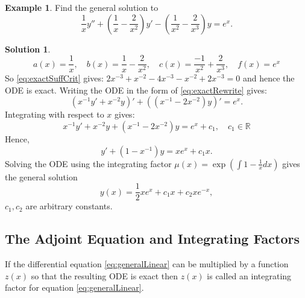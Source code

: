 \documentclass{article}
\theoremstyle{plain}
\theoremstyle{definition}
\newtheorem{exmp}{Example}[section]
\newtheorem*{sol}{Solution}
\numberwithin{equation}{section}
\begin{document}
\begin{tcolorbox}
    \begin{exmp}
        Find the general solution to
        \[
            \frac{1}{x}y'' + \left( \frac{1}{x} - \frac{2}{x^2}\right)y' - \left(\frac{1}{x^2} - \frac{2}{x^3}\right)y = e^x.
        \]
    \end{exmp}
    \begin{sol}
        \[a(x) = \frac{1}{x}, \quad b(x) = \frac{1}{x} - \frac{2}{x^2},\quad c(x) = \frac{-1}{x^2} + \frac{2}{x^3},\quad f(x)=e^x \]
        So \eqref{eq:exactSuffCrit} gives: $2x^{-3} + x^{-2} - 4x^{-3} - x^{-2} + 2x^{-3} = 0$ and hence the ODE is exact. Writing the ODE in the form of \eqref{eq:exactRewrite} gives:
        \[ \left(x^{-1}y' + x^{-2}y\right)' + \left(\left(x^{-1}-2x^{-2}\right)y\right)' = e^x. \]
        Integrating with respect to $x$ gives:
        \[ x^{-1}y' + x^{-2}y + (x^{-1}-2x^{-2})y = e^x + c_1, \quad c_1 \in \mathbb{R} \]
        Hence,
        \[ y' + (1-x^{-1})y = xe^x + c_1x. \]
        Solving the ODE using the integrating factor $\mu(x) = \exp\left( \int 1-\frac{1}{x} dx \right) $ gives the general solution
        \[ y(x) = \frac{1}{2}xe^x + c_1x + c_2xe^{-x}, \]
        $c_1,c_2$ are arbitrary constants.
    \end{sol}
\end{tcolorbox}

\subsection{The Adjoint Equation and Integrating Factors}

If the differential equation \eqref{eq:generalLinear} can be multiplied by a function $z(x)$ so that the resulting ODE is exact then $z(x)$ is called an integrating factor for equation \eqref{eq:generalLinear}.
\end{document}
